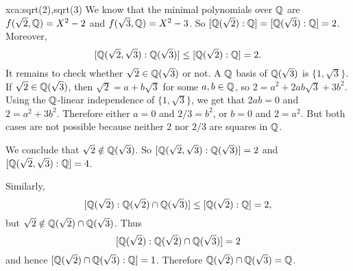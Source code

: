 \begin{sol}{xca:sqrt(2),sqrt(3)}
    We know that the minimal polynomials over $\mathbb{Q}$ are
    $f(\sqrt{2},\mathbb{Q})=X^2-2$ and $f(\sqrt{3},\mathbb{Q})=X^2-3$.
    So $[\mathbb{Q}(\sqrt{2}):\mathbb{Q}]=[\mathbb{Q}(\sqrt{3}):\mathbb{Q}]=2$.
    Moreover,
    \[
    [\mathbb{Q}(\sqrt{2},\sqrt{3}):\mathbb{Q}(\sqrt{3})]\leq [\mathbb{Q}(\sqrt{2}):\mathbb{Q}]=2.
    \]
    It remains to check whether $\sqrt{2}\in \mathbb{Q}(\sqrt{3})$ or not.
    A $\mathbb{Q}$ basis of $\mathbb{Q}(\sqrt{3})$ is $\{1,\sqrt{3}\}$.
    If $\sqrt{2}\in \mathbb{Q}(\sqrt{3})$, then $\sqrt{2}=a+b\sqrt{3}$ for 
    some $a,b\in\mathbb{Q}$, so $2=a^2+2ab\sqrt{3}+3b^2$.
    Using the $\mathbb{Q}$-linear independence of $\{1,\sqrt{3}\}$,
    we get that $2ab=0$ and $2=a^2+3b^2$.
    Therefore either $a=0$ and $2/3=b^2$,
    or $b=0$ and $2=a^2$.
    But both cases are not possible because neither $2$ nor $2/3$ are 
    squares in $\mathbb{Q}$.

    We conclude that $\sqrt{2}\notin\mathbb{Q}(\sqrt{3})$.
    So $[\mathbb{Q}(\sqrt{2},\sqrt{3}):\mathbb{Q}(\sqrt{3})]=2$ and
    $[\mathbb{Q}(\sqrt{2},\sqrt{3}):\mathbb{Q}]=4$.
    \begin{center}
    \end{center}
    Similarly, 
    \[
    [\mathbb{Q}(\sqrt{2}):\mathbb{Q}(\sqrt{2})\cap\mathbb{Q}(\sqrt{3})]\leq [\mathbb{Q}(\sqrt{2}):\mathbb{Q}]=2,
    \]
    but $\sqrt{2}\notin\mathbb{Q}(\sqrt{2})\cap\mathbb{Q}(\sqrt{3})$. Thus 
    \[
    [\mathbb{Q}(\sqrt{2}):\mathbb{Q}(\sqrt{2})\cap\mathbb{Q}(\sqrt{3})]=2
    \] 
    and hence $[\mathbb{Q}(\sqrt{2})\cap\mathbb{Q}(\sqrt{3}):\mathbb{Q}]=1$. Therefore  $\mathbb{Q}(\sqrt{2})\cap\mathbb{Q}(\sqrt{3})=\mathbb{Q}$.
\end{sol}


